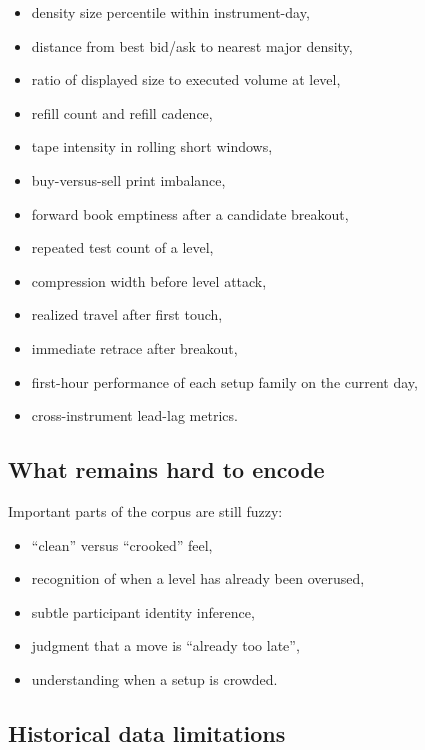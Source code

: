 \begin{itemize}
\item density size percentile within instrument-day,
\item distance from best bid/ask to nearest major density,
\item ratio of displayed size to executed volume at level,
\item refill count and refill cadence,
\item tape intensity in rolling short windows,
\item buy-versus-sell print imbalance,
\item forward book emptiness after a candidate breakout,
\item repeated test count of a level,
\item compression width before level attack,
\item realized travel after first touch,
\item immediate retrace after breakout,
\item first-hour performance of each setup family on the current day,
\item cross-instrument lead-lag metrics.
\end{itemize}

\subsection{What remains hard to encode}

Important parts of the corpus are still fuzzy:

\begin{itemize}
\item ``clean'' versus ``crooked'' feel,
\item recognition of when a level has already been overused,
\item subtle participant identity inference,
\item judgment that a move is ``already too late'',
\item understanding when a setup is crowded.
\end{itemize}


\subsection{Historical data limitations}


